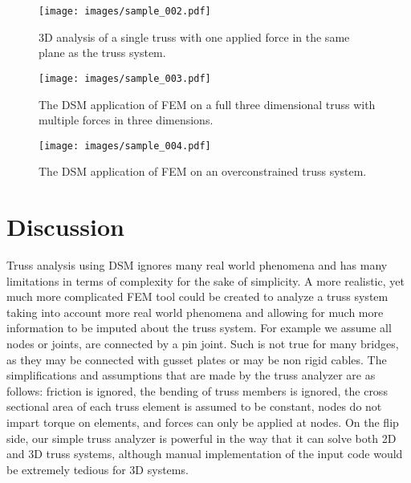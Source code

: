 \documentclass{article}
\begin{document}
\begin{figure}[H]
    \begin{center}
        \texttt{[image: images/sample\_002.pdf]}
        \caption{3D analysis of a single truss with one applied force in the
        same plane as the truss system.}
    \end{center}
\end{figure}


\begin{figure}[H]
    \begin{center}
        \texttt{[image: images/sample\_003.pdf]}
        \caption{The DSM application of FEM on a full three dimensional truss
        with multiple forces in three dimensions.}
    \end{center}
\end{figure}


\begin{figure}[H]
    \begin{center}
        \texttt{[image: images/sample\_004.pdf]}
        \caption{The DSM application of FEM on an overconstrained truss
        system.}
    \end{center}
\end{figure}




\section{Discussion}

Truss analysis using DSM ignores many real world phenomena and has many
limitations in terms of complexity for the sake of simplicity. A more
realistic, yet much more complicated FEM tool could be created to analyze a
truss system taking into account more real world phenomena and allowing for
much more information to be imputed about the truss system. For example we
assume all nodes or joints, are connected by a pin joint. Such is not true for
many bridges, as they may be connected with gusset plates or may be non rigid
cables. The simplifications and assumptions that are made by the truss
analyzer are as follows: friction is ignored, the bending of truss members is
ignored, the cross sectional area of each truss element is assumed to be
constant, nodes do not impart torque on elements, and forces can only be
applied at nodes. On the flip side, our simple truss analyzer is powerful in
the way that it can solve both 2D and 3D truss systems, although manual
implementation of the input code would be extremely tedious for 3D systems.
\end{document}
